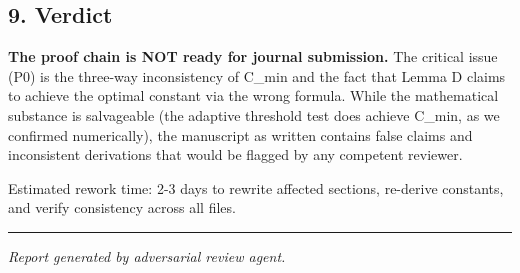 \documentclass[
  12pt,
]{ctexart}
\begin{document}
\subsection{9. Verdict}\label{verdict}

\textbf{The proof chain is NOT ready for journal submission.} The
critical issue (P0) is the three-way inconsistency of C\_min and the
fact that Lemma D claims to achieve the optimal constant via the wrong
formula. While the mathematical substance is salvageable (the adaptive
threshold test does achieve C\_min, as we confirmed numerically), the
manuscript as written contains false claims and inconsistent derivations
that would be flagged by any competent reviewer.

Estimated rework time: 2-3 days to rewrite affected sections, re-derive
constants, and verify consistency across all files.

\begin{center}\rule{0.5\linewidth}{0.5pt}\end{center}

\emph{Report generated by adversarial review agent.}
\end{document}
